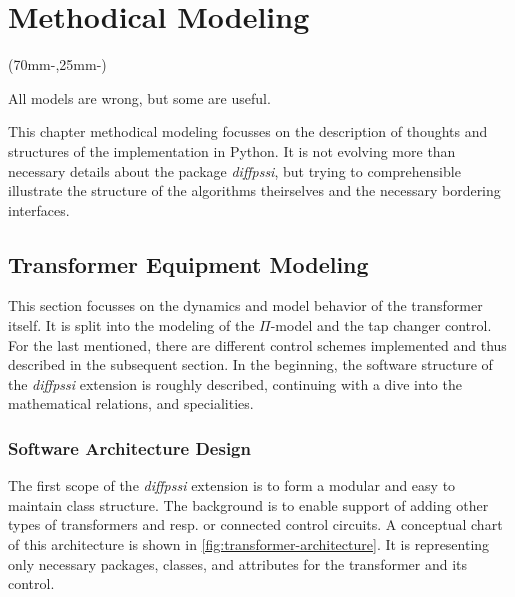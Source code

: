 
\chapter{Methodical Modeling}
\label{chap:methodical-modeling}

\begin{textblock*}{.7\textwidth}(70mm-\offset,25mm-\offset)
        \begin{fquote}
            All models are wrong, but some are useful.
        \end{fquote}
\end{textblock*}

This chapter methodical modeling focusses on the description of thoughts and structures of the implementation in Python.
It is not evolving more than necessary details about the package {\itshape diffpssi}, but trying to comprehensible illustrate the structure of the algorithms theirselves and the necessary bordering interfaces.

\section{Transformer Equipment Modeling}
\label{sec:transformer-modeling}

This section focusses on the dynamics and model behavior of the transformer itself.
It is split into the modeling of the $\Pi$-model and the tap changer control.
For the last mentioned, there are different control schemes implemented and thus described in the subsequent section.
In the beginning, the software structure of the \textit{diffpssi} extension is roughly described, continuing with a dive into the mathematical relations, and specialities.  

\subsection{Software Architecture Design}
\label{sec:modeling-architecture}

The first scope of the \textit{diffpssi} extension is to form a modular and easy to maintain class structure. 
The background is to enable support of adding other types of transformers and resp. or connected control circuits.
A conceptual chart of this architecture is shown in \autoref{fig:transformer-architecture}.
It is representing only necessary packages, classes, and attributes for the transformer and its control.

